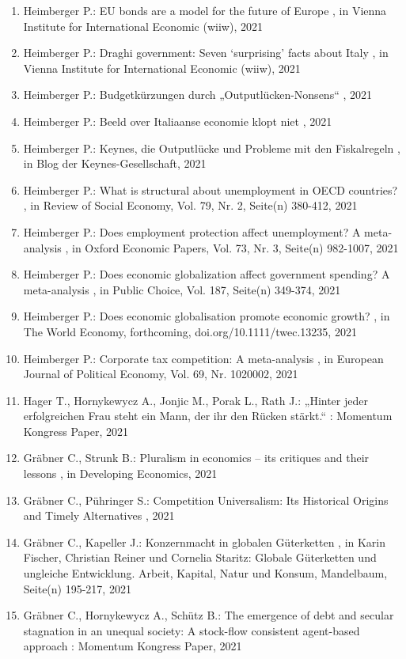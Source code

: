\begin{enumerate}[leftmargin=*, labelsep=0.5cm]
	 \item Heimberger P.:  EU bonds are a model for the future of Europe  , in Vienna Institute for International Economic (wiiw), 2021
	 \item Heimberger P.:  Draghi government: Seven ‘surprising’ facts about Italy  , in Vienna Institute for International Economic (wiiw), 2021
	 \item Heimberger P.:  Budgetkürzungen durch „Outputlücken-Nonsens“  , 2021
	 \item Heimberger P.:  Beeld over Italiaanse economie klopt niet  , 2021
	 \item Heimberger P.:  Keynes, die Outputlücke und Probleme mit den Fiskalregeln  , in Blog der Keynes-Gesellschaft, 2021
	 \item Heimberger P.:  What is structural about unemployment in OECD countries?  , in Review of Social Economy, Vol. 79, Nr. 2, Seite(n) 380-412, 2021
	 \item Heimberger P.:  Does employment protection affect unemployment? A meta-analysis  , in Oxford Economic Papers, Vol. 73, Nr. 3, Seite(n) 982-1007, 2021
	 \item Heimberger P.:  Does economic globalization affect government spending? A meta-analysis  , in Public Choice, Vol. 187, Seite(n) 349-374, 2021
	 \item Heimberger P.:  Does economic globalisation promote economic growth?  , in The World Economy, forthcoming, doi.org/10.1111/twec.13235, 2021
	 \item Heimberger P.:  Corporate tax competition: A meta-analysis  , in European Journal of Political Economy, Vol. 69, Nr. 1020002, 2021
	 \item Hager T., Hornykewycz A., Jonjic M., Porak L., Rath J.:  „Hinter jeder erfolgreichen Frau steht ein Mann, der ihr den Rücken stärkt.“  : Momentum Kongress Paper, 2021
	 \item Gräbner C., Strunk B.:  Pluralism in economics – its critiques and their lessons  , in Developing Economics, 2021
	 \item Gräbner C., Pühringer S.:  Competition Universalism: Its Historical Origins and Timely Alternatives  , 2021
	 \item Gräbner C., Kapeller J.:  Konzernmacht in globalen Güterketten  , in Karin Fischer, Christian Reiner und Cornelia Staritz: Globale Güterketten und ungleiche Entwicklung. Arbeit, Kapital, Natur und Konsum, Mandelbaum, Seite(n) 195-217, 2021
	 \item Gräbner C., Hornykewycz A., Schütz B.:  The emergence of debt and secular stagnation in an unequal society: A stock-flow consistent agent-based approach  : Momentum Kongress Paper, 2021

\end{enumerate}
